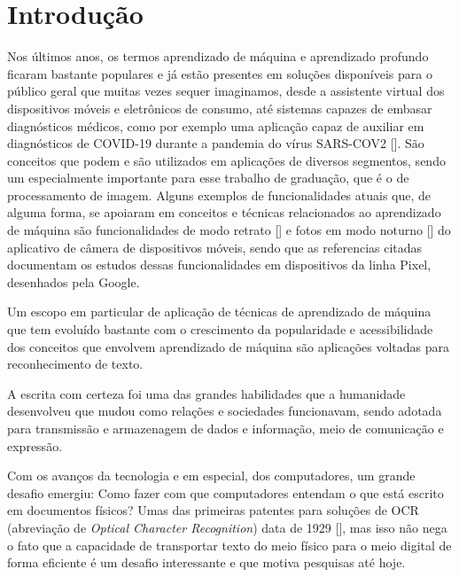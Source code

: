 
\chapter[Introdução]{Introdução}

Nos últimos anos, os termos aprendizado de máquina e aprendizado profundo ficaram bastante populares e já estão presentes em soluções disponíveis para o público geral que muitas vezes sequer imaginamos, desde a assistente virtual dos dispositivos móveis e eletrônicos de consumo, até sistemas capazes de embasar diagnósticos médicos, como por exemplo uma aplicação capaz de auxiliar em diagnósticos de COVID-19 durante a pandemia do vírus SARS-COV2 []. São conceitos que podem e são utilizados em aplicações de diversos segmentos, sendo um especialmente importante para esse trabalho de graduação, que é o de processamento de imagem. Alguns exemplos de funcionalidades atuais que, de alguma forma, se apoiaram em conceitos e técnicas relacionados ao aprendizado de máquina são funcionalidades de modo retrato [] e fotos em modo noturno [] do aplicativo de câmera de dispositivos móveis, sendo que as referencias citadas documentam os estudos dessas funcionalidades em dispositivos da linha Pixel, desenhados pela Google.

Um escopo em particular de aplicação de técnicas de aprendizado de máquina que tem evoluído bastante com o crescimento da popularidade e acessibilidade dos conceitos que envolvem aprendizado de máquina são aplicações voltadas para reconhecimento de texto. 

A escrita com certeza foi uma das grandes habilidades que a humanidade desenvolveu que mudou como relações e sociedades funcionavam, sendo adotada para transmissão e armazenagem de dados e informação, meio de comunicação e expressão.

Com os avanços da tecnologia e em especial, dos computadores, um grande desafio emergiu: Como fazer com que computadores entendam o que está escrito em documentos físicos? Umas das primeiras patentes para soluções de OCR (abreviação de \textit{Optical Character Recognition}) data de 1929 [], mas isso não nega o fato que a capacidade de transportar texto do meio físico para o meio digital de forma eficiente é um desafio interessante e que motiva pesquisas até hoje.

